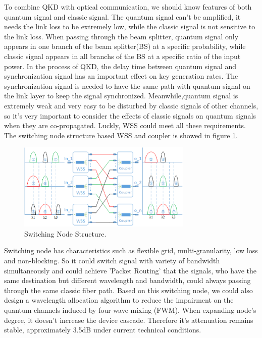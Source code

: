 \documentclass[letterpaper,10pt]{article}
\begin{document}
To combine QKD with optical communication, we should know features of both quantum signal and classic signal. The quantum signal can't be amplified, it needs the link loss to be extremely low, while the classic signal is not sensitive to the link loss. When passing through the beam splitter, quantum signal only appears in one branch of the beam splitter(BS) at a specific probability, while classic signal appears in all branchs of the BS at a specific ratio of the input power. In the process of QKD, the delay time between quantum signal and synchronization signal has an important effect on key generation rates. The synchronization signal is needed to have the same path with quantum signal on the link layer to keep the signal synchronized. Meanwhile,quantum signal is extremely weak and very easy to be disturbed by classic signals of other channels, so it's very important to consider the effects of classic signals on quantum signals when they are co-propagated. Luckly, WSS could meet all these requirements. The switching node structure based WSS and coupler is showed in figure \ref{Fig:switching_node_structure}.

\begin{figure}[htbp]
  \centering
  \includegraphics[width=8.3cm]{swtiching_node_struct}
  \caption{Switching Node Structure.} \label{Fig:switching_node_structure}
\end{figure}
Switching node has characteristics such as flexible grid, multi-granularity, low loss and non-blocking. So it could switch signal with variety of bandwidth simultaneously and could achieve 'Packet Routing' that the signals, who have the same destination but different wavelength and bandwidth, could always passing through the same classic fiber path. Based on this switching node, we could also design a wavelength allocation algorithm to reduce the impairment on the quantum channels induced by four-wave mixing (FWM). When expanding node's degree, it doesn't increase the device cascade. Therefore it's attenuation remains stable, approximately 3.5dB under current technical conditions. 
\end{document}

